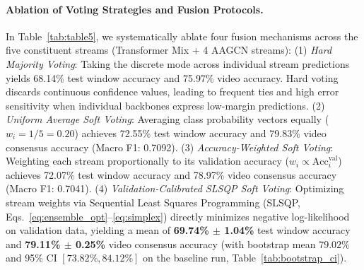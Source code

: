 \documentclass[preprint,12pt]{elsarticle}
\begin{document}
\paragraph{Ablation of Voting Strategies and Fusion Protocols.} In Table~\ref{tab:table5}, we systematically ablate four fusion mechanisms across the five constituent streams (Transformer Mix + 4 AAGCN streams):
(1) \textit{Hard Majority Voting}: Taking the discrete mode across individual stream predictions yields 68.14\% test window accuracy and 75.97\% video accuracy. Hard voting discards continuous confidence values, leading to frequent ties and high error sensitivity when individual backbones express low-margin predictions.
(2) \textit{Uniform Average Soft Voting}: Averaging class probability vectors equally ($w_i = 1/5 = 0.20$) achieves 72.55\% test window accuracy and 79.83\% video consensus accuracy (Macro F1: 0.7092).
(3) \textit{Accuracy-Weighted Soft Voting}: Weighting each stream proportionally to its validation accuracy ($w_i \propto \text{Acc}_i^{\text{val}}$) achieves 72.07\% test window accuracy and 78.97\% video consensus accuracy (Macro F1: 0.7041).
(4) \textit{Validation-Calibrated SLSQP Soft Voting}: Optimizing stream weights via Sequential Least Squares Programming (SLSQP, Eqs.~\eqref{eq:ensemble_opt}--\eqref{eq:simplex}) directly minimizes negative log-likelihood on validation data, yielding a mean of \textbf{69.74\% $\pm$ 1.04\%} test window accuracy and \textbf{79.11\% $\pm$ 0.25\%} video consensus accuracy (with bootstrap mean $79.02\%$ and 95\% CI $[73.82\%, 84.12\%]$ on the baseline run, Table~\ref{tab:bootstrap_ci}).
\end{document}
